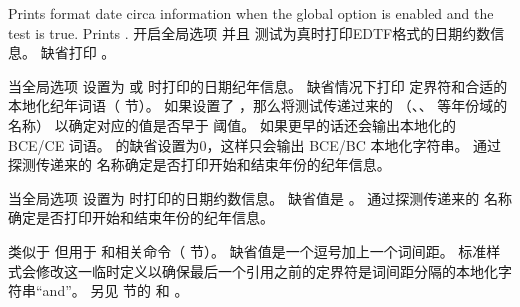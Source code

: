 \begin{ltxsyntax}
Prints  format date circa information when the global option  is enabled and the  test is true. Prints .
开启全局选项  并且  测试为真时打印EDTF格式的日期约数信息。
缺省打印 。

当全局选项  设置为  或  时打印的日期纪年信息。
缺省情况下打印  定界符和合适的本地化纪年词语（ 节）。
如果设置了 ，那么将测试传递过来的 
（、、 等年份域的名称）
以确定对应的值是否早于  阈值。
如果更早的话还会输出本地化的 BCE/CE 词语。
 的缺省设置为0，这样只会输出 BCE/BC 本地化字符串。
通过探测传递来的  名称确定是否打印开始和结束年份的纪年信息。

当全局选项  设置为  时打印的日期约数信息。
缺省值是 。
通过探测传递来的  名称确定是否打印开始和结束年份的纪年信息。

类似于  但用于  和相关命令（ 节）。
缺省值是一个逗号加上一个词间距。
标准样式会修改这一临时定义以确保最后一个引用之前的定界符是词间距分隔的本地化字符串“and”。
另见  节的  和 。


\end{ltxsyntax}
